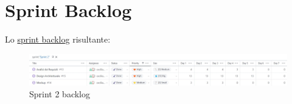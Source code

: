 \section{Sprint Backlog}
Lo \href{https://github.com/orgs/ISIQuiz/projects/3/}{sprint backlog} risultante:
\begin{figure}[H]
    \centering
    \includegraphics[width=\textwidth]{process/Img/Sprint2BL.jpg}
    \caption{Sprint 2 backlog}
    \label{fig:Sprint2}
\end{figure}
